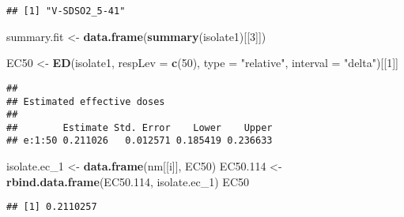 \documentclass[
]{article}
\newenvironment{Shaded}{\begin{snugshade}}{\end{snugshade}}
\newcommand{\AttributeTok}[1]{\textcolor[rgb]{0.13,0.29,0.53}{#1}}
\newcommand{\DecValTok}[1]{\textcolor[rgb]{0.00,0.00,0.81}{#1}}
\newcommand{\FloatTok}[1]{\textcolor[rgb]{0.00,0.00,0.81}{#1}}
\newcommand{\FunctionTok}[1]{\textcolor[rgb]{0.13,0.29,0.53}{\textbf{#1}}}
\newcommand{\NormalTok}[1]{#1}
\newcommand{\OtherTok}[1]{\textcolor[rgb]{0.56,0.35,0.01}{#1}}
\newcommand{\StringTok}[1]{\textcolor[rgb]{0.31,0.60,0.02}{#1}}
\begin{document}
\begin{verbatim}
## [1] "V-SDSO2_5-41"
\end{verbatim}

\begin{Shaded}
\begin{Highlighting}[]
\NormalTok{summary.fit }\OtherTok{\textless{}{-}} \FunctionTok{data.frame}\NormalTok{(}\FunctionTok{summary}\NormalTok{(isolate1)[[}\DecValTok{3}\NormalTok{]])}

\NormalTok{EC50 }\OtherTok{\textless{}{-}} \FunctionTok{ED}\NormalTok{(isolate1, }\AttributeTok{respLev =} \FunctionTok{c}\NormalTok{(}\DecValTok{50}\NormalTok{), }\AttributeTok{type =} \StringTok{"relative"}\NormalTok{, }
             \AttributeTok{interval =} \StringTok{"delta"}\NormalTok{)[[}\DecValTok{1}\NormalTok{]] }
\end{Highlighting}
\end{Shaded}

\begin{verbatim}
## 
## Estimated effective doses
## 
##        Estimate Std. Error    Lower    Upper
## e:1:50 0.211026   0.012571 0.185419 0.236633
\end{verbatim}

\begin{Shaded}
\begin{Highlighting}[]
\NormalTok{isolate.ec\_1 }\OtherTok{\textless{}{-}} \FunctionTok{data.frame}\NormalTok{(nm[[i]], EC50)}
\NormalTok{EC50}\FloatTok{.114} \OtherTok{\textless{}{-}} \FunctionTok{rbind.data.frame}\NormalTok{(EC50}\FloatTok{.114}\NormalTok{, isolate.ec\_1)}
\NormalTok{        EC50}
\end{Highlighting}
\end{Shaded}

\begin{verbatim}
## [1] 0.2110257
\end{verbatim}
\end{document}
